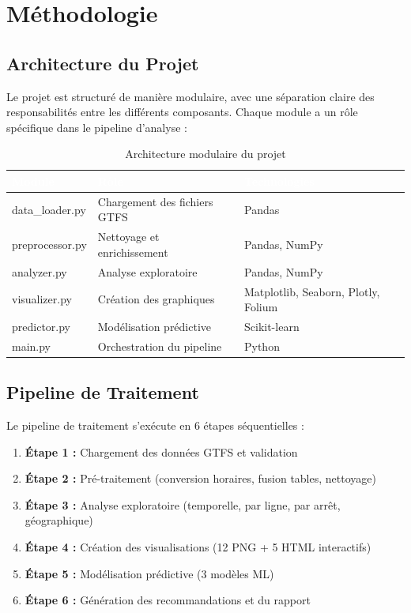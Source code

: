\documentclass[12pt,a4paper]{article}
\begin{document}
\section{Méthodologie}

\subsection{Architecture du Projet}

Le projet est structuré de manière modulaire, avec une séparation claire des responsabilités entre les différents composants. Chaque module a un rôle spécifique dans le pipeline d'analyse :

\begin{table}[H]
\centering
\begin{tabular}{|l|l|l|}
\hline
\rowcolor{bleuTBM} \textcolor{white}{\textbf{Module}} & \textcolor{white}{\textbf{Rôle}} & \textcolor{white}{\textbf{Technologies}} \\
\hline
data\_loader.py & Chargement des fichiers GTFS & Pandas \\
\hline
\rowcolor{grisClair} preprocessor.py & Nettoyage et enrichissement & Pandas, NumPy \\
\hline
analyzer.py & Analyse exploratoire & Pandas, NumPy \\
\hline
\rowcolor{grisClair} visualizer.py & Création des graphiques & Matplotlib, Seaborn, Plotly, Folium \\
\hline
predictor.py & Modélisation prédictive & Scikit-learn \\
\hline
\rowcolor{grisClair} main.py & Orchestration du pipeline & Python \\
\hline
\end{tabular}
\caption{Architecture modulaire du projet}
\end{table}

\subsection{Pipeline de Traitement}

Le pipeline de traitement s'exécute en 6 étapes séquentielles :

\begin{enumerate}[leftmargin=2cm]
    \item \textbf{Étape 1 :} Chargement des données GTFS et validation
    \item \textbf{Étape 2 :} Pré-traitement (conversion horaires, fusion tables, nettoyage)
    \item \textbf{Étape 3 :} Analyse exploratoire (temporelle, par ligne, par arrêt, géographique)
    \item \textbf{Étape 4 :} Création des visualisations (12 PNG + 5 HTML interactifs)
    \item \textbf{Étape 5 :} Modélisation prédictive (3 modèles ML)
    \item \textbf{Étape 6 :} Génération des recommandations et du rapport
\end{enumerate}
\end{document}
